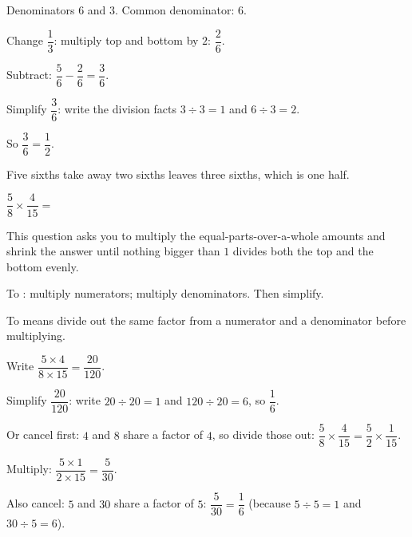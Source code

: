 \begin{steps}
  \item Denominators $6$ and $3$. Common denominator: $6$.
  \item Change $\dfrac{1}{3}$: multiply top and bottom by $2$: $\dfrac{2}{6}$.
  \item Subtract: $\dfrac{5}{6} - \dfrac{2}{6} = \dfrac{3}{6}$.
  \item Simplify $\dfrac{3}{6}$: write the division facts $3 \div 3 = 1$ and
        $6 \div 3 = 2$.
  \item So $\dfrac{3}{6} = \dfrac{1}{2}$.
\end{steps}


\noindent Five sixths take away two sixths leaves three sixths, which is one
half.


\noindent $\dfrac{5}{8} \times \dfrac{4}{15} = $\ansblank{}


\noindent This question asks you to multiply the equal-parts-over-a-whole
amounts and shrink the answer until nothing bigger than $1$ divides both the top
and the bottom evenly.

\begin{words}
  \item To \unskip: multiply numerators; multiply
        denominators. Then simplify.
  \item To means divide out the same factor from a numerator and a
        denominator before multiplying.
\end{words}

\begin{steps}
  \item Write $\dfrac{5 \times 4}{8 \times 15} = \dfrac{20}{120}$.
  \item Simplify $\dfrac{20}{120}$: write $20 \div 20 = 1$ and
        $120 \div 20 = 6$, so $\dfrac{1}{6}$.
  \item Or cancel first: $4$ and $8$ share a factor of $4$, so divide those out:
        $\dfrac{5}{8} \times \dfrac{4}{15} = \dfrac{5}{2} \times \dfrac{1}{15}$.
  \item Multiply: $\dfrac{5 \times 1}{2 \times 15} = \dfrac{5}{30}$.
  \item Also cancel: $5$ and $30$ share a factor of $5$:
        $\dfrac{5}{30} = \dfrac{1}{6}$ (because $5 \div 5 = 1$ and
        $30 \div 5 = 6$).
\end{steps}

